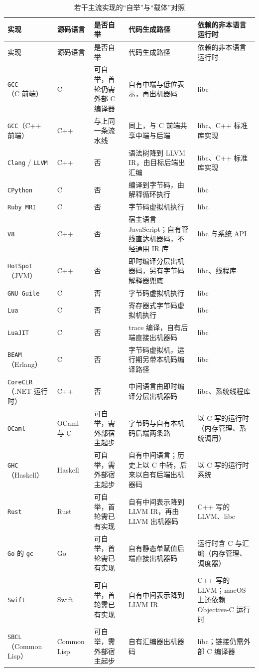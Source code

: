 \documentclass[12pt,a4paper,fontset=fandol]{ctexbook}
\newcommand{\Lang}[1]{\textsf{#1}}
\newcommand{\CL}{\Lang{C}}
\newcommand{\CPP}{\Lang{C++}}
\newcommand{\Tool}[1]{\texttt{#1}}
\newcommand{\Mx}[1]{\textsf{#1}}
\newcommand{\Mac}{\textsf{macOS}}
\begin{document}
\begin{longtable}{@{}>{\raggedright\arraybackslash}p{} >{\raggedright\arraybackslash}p{} >{\raggedright\arraybackslash}p{} >{\raggedright\arraybackslash}p{} >{\raggedright\arraybackslash}p{}@{}}
\caption{若干主流实现的“自举”与“载体”对照}\label{tab:cl01-carrier}\\
\toprule
实现 & 源码语言 & 是否自举 & 代码生成路径 & 依赖的非本语言运行时 \\
\midrule
\endfirsthead
\toprule
实现 & 源码语言 & 是否自举 & 代码生成路径 & 依赖的非本语言运行时 \\
\midrule
\endhead
\bottomrule
\endfoot
\Tool{GCC}（C 前端） & \CL & 可自举，首轮仍需外部 \CL{} 编译器 & 自有中端与低位表示，再出机器码 & libc \\
\Tool{GCC}（C++ 前端） & \CPP & 与上同一条流水线 & 同上，与 C 前端共享中端与后端 & libc、\CPP{} 标准库实现 \\
\Tool{Clang} / \Tool{LLVM} & \CPP & 否 & 语法树降到 LLVM IR，由目标后端出汇编 & libc、\CPP{} 标准库实现 \\
\Tool{CPython} & \CL & 否 & 编译到字节码，由解释循环执行 & libc \\
\Tool{Ruby MRI} & \CL & 否 & 字节码虚拟机执行 & libc \\
\Tool{V8} & \CPP & 否 & 宿主语言 \Lang{JavaScript}；自有管线直达机器码，不经通用 IR 库 & libc 与系统 API \\
\Tool{HotSpot}（\Lang{JVM}） & \CPP & 否 & 即时编译分层出机器码，另有字节码解释器兜底 & libc、线程库 \\
\Tool{GNU Guile} & \CL & 否 & 字节码虚拟机执行 & libc \\
\Tool{Lua} & \CL & 否 & 寄存器式字节码虚拟机执行 & libc \\
\Tool{LuaJIT} & \CL & 否 & trace 编译，自有后端直接出机器码 & libc \\
\Tool{BEAM}（\Mx{Erlang}） & \CL & 否 & 字节码虚拟机，运行期另带本机码编译路径 & libc \\
\Tool{CoreCLR}（.NET 运行时） & \CPP & 否 & 中间语言由即时编译分层出机器码 & libc、系统线程库 \\
\Tool{OCaml} & \Mx{OCaml} 与 \CL & 可自举，需外部宿主起步 & 字节码与自有本机码后端两条路 & 以 \CL{} 写的运行时（内存管理、系统调用） \\
\Tool{GHC}（\Mx{Haskell}） & \Mx{Haskell} & 可自举，需外部宿主起步 & 自有中间语言；历史上以 \CL{} 中转，后来以自有后端出机器码 & 以 \CL{} 写的运行时系统 \\
\Tool{Rust} & \Mx{Rust} & 可自举，首轮需已有实现 & 自有中间表示降到 LLVM IR，再由 LLVM 出机器码 & \CPP{} 写的 LLVM、libc \\
\Tool{Go} 的 \Tool{gc} & \Mx{Go} & 可自举，首轮需已有实现 & 自有静态单赋值后端直接出机器码 & 运行时含 \CL{} 与汇编（内存管理、调度器） \\
\Tool{Swift} & \Mx{Swift} & 可自举，首轮需已有实现 & 自有中间表示降到 LLVM IR & \CPP{} 写的 LLVM；\Mac{} 上还依赖 \Mx{Objective-C} 运行时 \\
\Tool{SBCL}（\Mx{Common Lisp}） & \Mx{Common Lisp} & 可自举，需外部宿主起步 & 自有汇编器出机器码 & libc；链接仍需外部 \CL{} 编译器 \\
\end{longtable}
\end{document}

